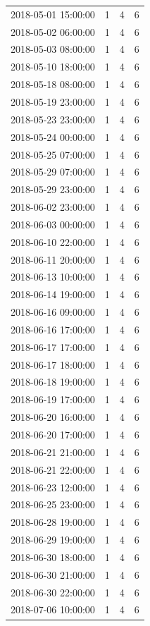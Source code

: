 \begin{tabular}{lrrr}
2018-05-01 15:00:00 & 1 & 4 & 6 \\
2018-05-02 06:00:00 & 1 & 4 & 6 \\
2018-05-03 08:00:00 & 1 & 4 & 6 \\
2018-05-10 18:00:00 & 1 & 4 & 6 \\
2018-05-18 08:00:00 & 1 & 4 & 6 \\
2018-05-19 23:00:00 & 1 & 4 & 6 \\
2018-05-23 23:00:00 & 1 & 4 & 6 \\
2018-05-24 00:00:00 & 1 & 4 & 6 \\
2018-05-25 07:00:00 & 1 & 4 & 6 \\
2018-05-29 07:00:00 & 1 & 4 & 6 \\
2018-05-29 23:00:00 & 1 & 4 & 6 \\
2018-06-02 23:00:00 & 1 & 4 & 6 \\
2018-06-03 00:00:00 & 1 & 4 & 6 \\
2018-06-10 22:00:00 & 1 & 4 & 6 \\
2018-06-11 20:00:00 & 1 & 4 & 6 \\
2018-06-13 10:00:00 & 1 & 4 & 6 \\
2018-06-14 19:00:00 & 1 & 4 & 6 \\
2018-06-16 09:00:00 & 1 & 4 & 6 \\
2018-06-16 17:00:00 & 1 & 4 & 6 \\
2018-06-17 17:00:00 & 1 & 4 & 6 \\
2018-06-17 18:00:00 & 1 & 4 & 6 \\
2018-06-18 19:00:00 & 1 & 4 & 6 \\
2018-06-19 17:00:00 & 1 & 4 & 6 \\
2018-06-20 16:00:00 & 1 & 4 & 6 \\
2018-06-20 17:00:00 & 1 & 4 & 6 \\
2018-06-21 21:00:00 & 1 & 4 & 6 \\
2018-06-21 22:00:00 & 1 & 4 & 6 \\
2018-06-23 12:00:00 & 1 & 4 & 6 \\
2018-06-25 23:00:00 & 1 & 4 & 6 \\
2018-06-28 19:00:00 & 1 & 4 & 6 \\
2018-06-29 19:00:00 & 1 & 4 & 6 \\
2018-06-30 18:00:00 & 1 & 4 & 6 \\
2018-06-30 21:00:00 & 1 & 4 & 6 \\
2018-06-30 22:00:00 & 1 & 4 & 6 \\
2018-07-06 10:00:00 & 1 & 4 & 6 \\

\end{tabular}
